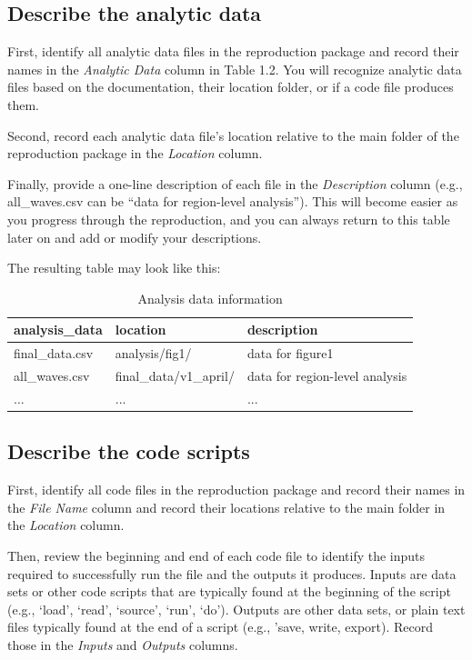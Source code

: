 \documentclass[
]{book}
\begin{document}
\hypertarget{desc-analy}{%
\subsection{Describe the analytic data}\label{desc-analy}}

First, identify all analytic data files in the reproduction package and record their names in the \emph{Analytic Data} column in Table 1.2. You will recognize analytic data files based on the documentation, their location folder, or if a code file produces them.

Second, record each analytic data file's location relative to the main folder of the reproduction package in the \emph{Location} column.

Finally, provide a one-line description of each file in the \emph{Description} column (e.g., all\_waves.csv can be ``data for region-level analysis''). This will become easier as you progress through the reproduction, and you can always return to this table later on and add or modify your descriptions.

The resulting table may look like this:

\begin{table}

\caption{\label{tab:analysis-data-information}Analysis data information}
\centering
\begin{tabu} to 
\hline
analysis\_data & location & description\\
\hline
final\_data.csv & analysis/fig1/ & data for figure1\\
\hline
all\_waves.csv & final\_data/v1\_april/ & data for region-level analysis\\
\hline
... & ... & ...\\
\hline
\end{tabu}
\end{table}

\hypertarget{desc-scripts}{%
\subsection{Describe the code scripts}\label{desc-scripts}}

First, identify all code files in the reproduction package and record their names in the \emph{File Name} column and record their locations relative to the main folder in the \emph{Location} column.

Then, review the beginning and end of each code file to identify the inputs required to successfully run the file and the outputs it produces. Inputs are data sets or other code scripts that are typically found at the beginning of the script (e.g., `load', `read', `source', `run', `do'). Outputs are other data sets, or plain text files typically found at the end of a script (e.g., 'save, write, export). Record those in the \emph{Inputs} and \emph{Outputs} columns.
\end{document}
